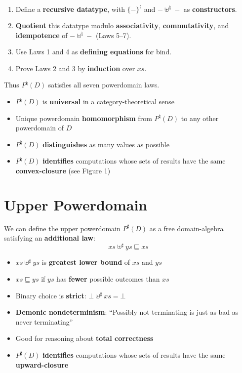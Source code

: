 \documentclass[portrait]{sciposter}
\begin{document}
\begin{multicols}{3}
\begin{sectionbox}{}
\begin{enumerate}
\item Define a \textbf{recursive datatype}, with $\{-\}^\natural$ and $-\uplus^\natural-$ as \textbf{constructors}.
\item \textbf{Quotient} this datatype modulo \textbf{associativity}, \textbf{commutativity}, and \textbf{idempotence} of $-\uplus^\natural-$ (Laws 5--7).
\item Use Laws 1 and 4 as \textbf{defining equations} for bind.
\item Prove Laws 2 and 3 by \textbf{induction} over $xs$.
\end{enumerate}
Thus $P^\natural(D)$ satisfies all seven powerdomain laws.
\end{sectionbox}

\begin{itemize}
\item $P^\natural(D)$ is \textbf{universal} in a category-theoretical sense
\item Unique powerdomain \textbf{homomorphism} from $P^\natural(D)$ to any other powerdomain of $D$
\item $P^\natural(D)$ \textbf{distinguishes} as many values as possible
\item $P^\natural(D)$ \textbf{identifies} computations whose sets of results have the same \textbf{convex-closure} (see Figure 1)
\end{itemize}

\section{Upper Powerdomain}

We can define the upper powerdomain $P^\sharp(D)$ as a free domain-algebra satisfying an \textbf{additional law}:
$$xs \uplus^\sharp ys \sqsubseteq xs$$

\begin{itemize}
\item $xs \uplus^\sharp ys$ is \textbf{greatest lower bound} of $xs$ and $ys$
\item $xs \sqsubseteq ys$ if $ys$ has \textbf{fewer} possible outcomes than $xs$
\item Binary choice is \textbf{strict}: $\bot\uplus^\sharp xs = \bot$
\item \textbf{Demonic nondeterminism}: ``Possibly not terminating is just as bad as never terminating''
\item Good for reasoning about \textbf{total correctness}
\item $P^\sharp(D)$ \textbf{identifies} computations whose sets of results have the same \textbf{upward-closure}
\end{itemize}


\end{multicols}
\end{document}
